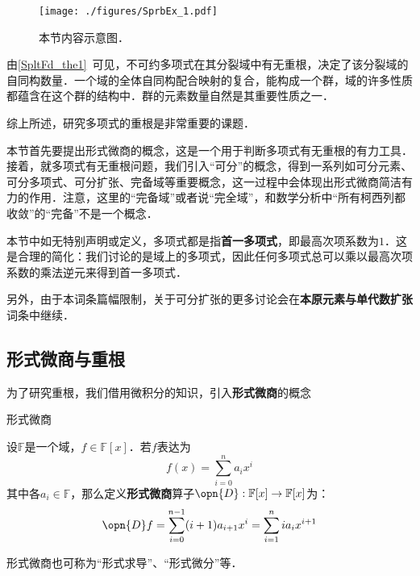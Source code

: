 




\begin{figure}[ht]
\centering
\texttt{[image: ./figures/SprbEx\_1.pdf]}
\caption{本节内容示意图．} \label{SprbEx_fig1}
\end{figure}


由\autoref{SpltFd_the1}~可见，不可约多项式在其分裂域中有无重根，决定了该分裂域的自同构数量．一个域的全体自同构配合映射的复合，能构成一个群，域的许多性质都蕴含在这个群的结构中．群的元素数量自然是其重要性质之一．

综上所述，研究多项式的重根是非常重要的课题．

本节首先要提出形式微商的概念，这是一个用于判断多项式有无重根的有力工具．接着，就多项式有无重根问题，我们引入“可分”的概念，得到一系列如可分元素、可分多项式、可分扩张、完备域等重要概念，这一过程中会体现出形式微商简洁有力的作用．注意，这里的“完备域”或者说“完全域”，和数学分析中“所有柯西列都收敛”的“完备”不是一个概念．

本节中如无特别声明或定义，多项式都是指\textbf{首一多项式}，即最高次项系数为$1$．这是合理的简化：我们讨论的是域上的多项式，因此任何多项式总可以乘以最高次项系数的乘法逆元来得到首一多项式．

另外，由于本词条篇幅限制，关于可分扩张的更多讨论会在\textbf{本原元素与单代数扩张}词条中继续．

\subsection{形式微商与重根}

为了研究重根，我们借用微积分的知识，引入\textbf{形式微商}的概念

\begin{definition}{形式微商}\label{SprbEx_def1}

设$\mathbb{F}$是一个域，$f\in\mathbb{F}[x]$．若$f$表达为
\begin{equation}
f(x) = \sum_{i=0}^n a_ix^i
\end{equation}
其中各$a_i\in\mathbb{F}$，那么定义\textbf{形式微商}算子$\opn{D}:\mathbb{F}[x]\to\mathbb{F}[x]$为：
\begin{equation}
\opn{D}f = \sum_{i=0}^{n-1} (i+1)a_{i+1}x^i = \sum_{i=1}^{n} ia_{i}x^{i+1}
\end{equation}

形式微商也可称为“形式求导”、“形式微分”等．

\end{definition}

